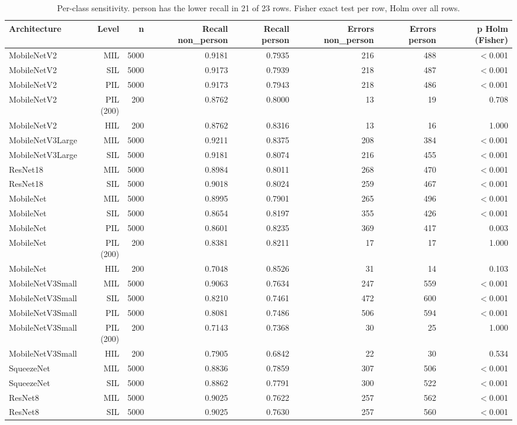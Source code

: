 \begin{table}[htbp]
\centering
\scriptsize
\caption{Per-class sensitivity. person has the lower recall in 21 of 23 rows. Fisher exact test per row, Holm over all rows.}
\label{tab:ladder-coco-niclavision-5}
\begin{tabular}{lrrrrrrr}
\toprule
Architecture & Level & n & Recall non\_person & Recall person & Errors non\_person & Errors person & p Holm (Fisher) \\
\midrule
MobileNetV2 & MIL & 5000 & 0.9181 & 0.7935 & 216 & 488 & $<$0.001 \\
MobileNetV2 & SIL & 5000 & 0.9173 & 0.7939 & 218 & 487 & $<$0.001 \\
MobileNetV2 & PIL & 5000 & 0.9173 & 0.7943 & 218 & 486 & $<$0.001 \\
MobileNetV2 & PIL (200) & 200 & 0.8762 & 0.8000 & 13 & 19 & 0.708 \\
MobileNetV2 & HIL & 200 & 0.8762 & 0.8316 & 13 & 16 & 1.000 \\
MobileNetV3Large & MIL & 5000 & 0.9211 & 0.8375 & 208 & 384 & $<$0.001 \\
MobileNetV3Large & SIL & 5000 & 0.9181 & 0.8074 & 216 & 455 & $<$0.001 \\
ResNet18 & MIL & 5000 & 0.8984 & 0.8011 & 268 & 470 & $<$0.001 \\
ResNet18 & SIL & 5000 & 0.9018 & 0.8024 & 259 & 467 & $<$0.001 \\
MobileNet & MIL & 5000 & 0.8995 & 0.7901 & 265 & 496 & $<$0.001 \\
MobileNet & SIL & 5000 & 0.8654 & 0.8197 & 355 & 426 & $<$0.001 \\
MobileNet & PIL & 5000 & 0.8601 & 0.8235 & 369 & 417 & 0.003 \\
MobileNet & PIL (200) & 200 & 0.8381 & 0.8211 & 17 & 17 & 1.000 \\
MobileNet & HIL & 200 & 0.7048 & 0.8526 & 31 & 14 & 0.103 \\
MobileNetV3Small & MIL & 5000 & 0.9063 & 0.7634 & 247 & 559 & $<$0.001 \\
MobileNetV3Small & SIL & 5000 & 0.8210 & 0.7461 & 472 & 600 & $<$0.001 \\
MobileNetV3Small & PIL & 5000 & 0.8081 & 0.7486 & 506 & 594 & $<$0.001 \\
MobileNetV3Small & PIL (200) & 200 & 0.7143 & 0.7368 & 30 & 25 & 1.000 \\
MobileNetV3Small & HIL & 200 & 0.7905 & 0.6842 & 22 & 30 & 0.534 \\
SqueezeNet & MIL & 5000 & 0.8836 & 0.7859 & 307 & 506 & $<$0.001 \\
SqueezeNet & SIL & 5000 & 0.8862 & 0.7791 & 300 & 522 & $<$0.001 \\
ResNet8 & MIL & 5000 & 0.9025 & 0.7622 & 257 & 562 & $<$0.001 \\
ResNet8 & SIL & 5000 & 0.9025 & 0.7630 & 257 & 560 & $<$0.001 \\
\bottomrule
\end{tabular}
\end{table}

